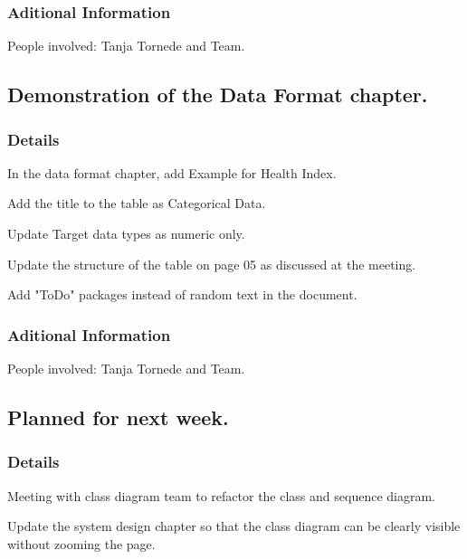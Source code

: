 \documentclass[11pt]{meetingmins} %
\begin{document}
	\subsubsection{Aditional Information}
		\begin{hiddensubitems}
			\item People involved: Tanja Tornede and Team.
		\end{hiddensubitems}

\subsection{Demonstration of the Data Format chapter.}
	\subsubsection{Details}
		\begin{hiddensubitems}
			\item In the data format chapter, add Example for Health Index.
			\item Add the title to the table as Categorical Data.
			\item Update Target data types as numeric only.
			\item Update the structure of the table on page 05 as discussed at the meeting.
			\item Add "ToDo" packages instead of random text in the document. 
		\end{hiddensubitems}
	\subsubsection{Aditional Information}
		\begin{hiddensubitems}
			\item People involved: Tanja Tornede and Team.
		\end{hiddensubitems}

\subsection{Planned for next week.}
    \subsubsection{Details}
        \begin{hiddensubitems}
            \item Meeting with class diagram team to refactor the class and sequence diagram.
			\item Update the system design chapter so that the class diagram can be clearly visible without zooming the page. 
        \end{hiddensubitems}
\end{document}
